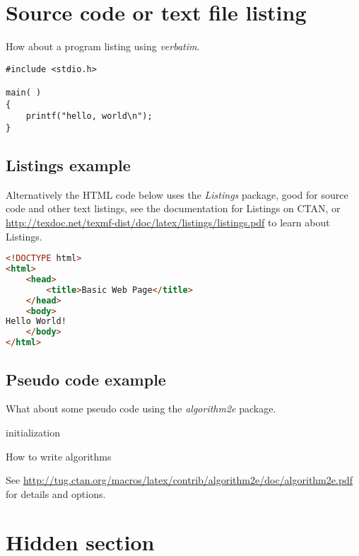 \clearpage

\section{Source code or text file listing}

How about a program listing using \emph{verbatim}.

\begin{verbatim} 
#include <stdio.h>

main( )
{
    printf("hello, world\n");
}
\end{verbatim}

\subsection{Listings example}

Alternatively the HTML code below uses the \emph{Listings} package, good for source code and other text listings, see the documentation for Listings on CTAN, or \url{http://texdoc.net/texmf-dist/doc/latex/listings/listings.pdf} to learn about Listings.

\begin{lstlisting}[language=HTML,caption={Hello World in HTML},label={lst:helloworld},float=ht]
<!DOCTYPE html>
<html>
    <head>
        <title>Basic Web Page</title>
    </head>
    <body>
Hello World!
    </body>
</html>
\end{lstlisting}

\subsection{Pseudo code example}

What about some pseudo code using the \emph{algorithm2e} package.

\begin{algorithm}[H]
 \SetAlgoLined
 initialization\;
\caption{How to write algorithms}
\end{algorithm}

See \url{http://tug.ctan.org/macros/latex/contrib/algorithm2e/doc/algorithm2e.pdf} for details and options.

\tochide\section{Hidden section}


